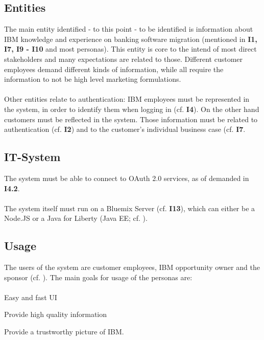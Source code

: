 \subsection{Entities}
The main entity identified - to this point - to be identified is information about IBM knowledge and experience on banking software migration (mentioned in \textbf{I1, I7, I9 - I10} and most personas). This entity is core to the intend of most direct stakeholders and many expectations are related to those. Different customer employees demand different kinds of information, while all require the information to not be high level marketing formulations.

\paragraph{} Other entities relate to authentication: IBM employees must be represented in the system, in order to identify them when logging in (cf. \textbf{I4}). On the other hand customers must be reflected in the system. Those information must be related to authentication (cf. \textbf{I2}) and to the customer's individual business case (cf. \textbf{I7}. 
\subsection{IT-System}
The system must be able to connect to OAuth 2.0 services, as of demanded in \textbf{I4.2}.

\paragraph{} The system itself must run on a Bluemix Server (cf. \textbf{I13}), which can either be a Node.JS or a Java for Liberty (Java EE; cf. \cite{}). 

\subsection{Usage}
The users of the system are customer employees, IBM opportunity owner and the sponsor (cf. \cpageref{}). The main goals for usage of the personas are: 
\paragraph{}
\begin{closeItemCol}
    \item Easy and fast UI
    \item Provide high quality information
    \item Provide a trustworthy picture of IBM.
\end{closeItemCol}

